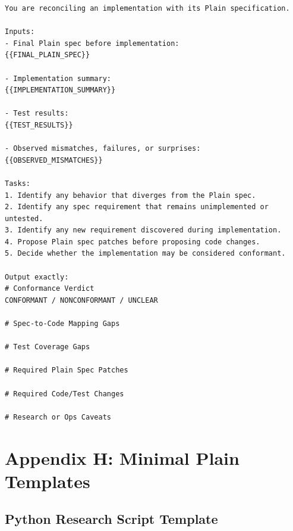 \documentclass[11pt]{article}
\begin{document}
\begin{lstlisting}
You are reconciling an implementation with its Plain specification.

Inputs:
- Final Plain spec before implementation:
{{FINAL_PLAIN_SPEC}}

- Implementation summary:
{{IMPLEMENTATION_SUMMARY}}

- Test results:
{{TEST_RESULTS}}

- Observed mismatches, failures, or surprises:
{{OBSERVED_MISMATCHES}}

Tasks:
1. Identify any behavior that diverges from the Plain spec.
2. Identify any spec requirement that remains unimplemented or untested.
3. Identify any new requirement discovered during implementation.
4. Propose Plain spec patches before proposing code changes.
5. Decide whether the implementation may be considered conformant.

Output exactly:
# Conformance Verdict
CONFORMANT / NONCONFORMANT / UNCLEAR

# Spec-to-Code Mapping Gaps

# Test Coverage Gaps

# Required Plain Spec Patches

# Required Code/Test Changes

# Research or Ops Caveats
\end{lstlisting}

\section{Appendix H: Minimal Plain Templates}

\subsection{Python Research Script Template}
\end{document}
